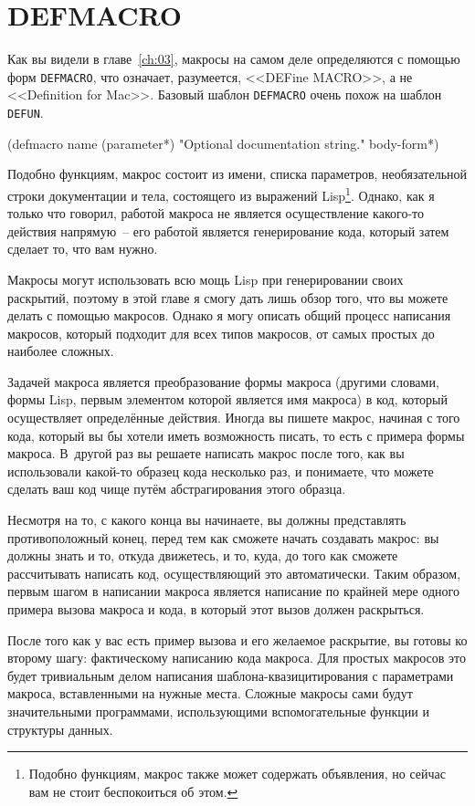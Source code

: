 \section{DEFMACRO}

Как вы видели в главе~\ref{ch:03}, макросы на самом деле определяются с помощью форм
\lstinline{DEFMACRO}, что означает, разумеется, <<DEFine MACRO>>, а не <<Definition for
Mac>>. Базовый шаблон \lstinline{DEFMACRO} очень похож на шаблон \lstinline{DEFUN}.

\begin{myverb}
(defmacro name (parameter*)
  "Optional documentation string."
  body-form*)
\end{myverb}

Подобно функциям, макрос состоит из имени, списка параметров, необязательной строки
документации и тела, состоящего из выражений Lisp\footnote{Подобно функциям, макрос также
  может содержать объявления, но сейчас вам не стоит беспокоиться об этом.}. Однако, как я
только что говорил, работой макроса не является осуществление какого-то действия
напрямую~-- его работой является генерирование кода, который затем сделает то, что вам
нужно.

Макросы могут использовать всю мощь Lisp при генерировании своих раскрытий, поэтому в этой
главе я смогу дать лишь обзор того, что вы можете делать с по\-мощью макросов. Однако я могу
описать общий процесс написания макросов, который подходит для всех типов макросов, от
самых простых до наиболее сложных.

Задачей макроса является преобразование формы макроса (другими словами, формы Lisp, первым
элементом которой является имя макроса) в код, который осуществляет определённые
действия. Иногда вы пишете макрос, начиная с того кода, который вы бы хотели иметь
возможность писать, то есть с примера формы макроса. В~другой раз вы решаете написать
макрос после того, как вы использовали какой-то образец кода несколько раз, и понимаете,
что можете сделать ваш код чище путём абстрагирования этого образца.

Несмотря на то, с какого конца вы начинаете, вы должны представлять противоположный конец,
перед тем как сможете начать создавать макрос: вы должны знать и то, откуда движетесь, и
то, куда, до того как сможете рассчитывать написать код, осуществляющий это
автоматически. Таким образом, первым шагом в написании макроса является написание по
крайней мере одного примера вызова макроса и кода, в который этот вызов должен
раскрыться.

После того как у вас есть пример вызова и его желаемое раскрытие, вы готовы ко второму
шагу: фактическому написанию кода макроса. Для простых макросов это будет тривиальным
делом написания шаблона-квазицитирования с параметрами макроса, вставленными на нужные
места. Сложные макросы сами будут значительными программами, использующими вспомогательные
функции и структуры данных.

